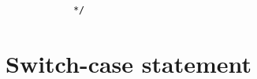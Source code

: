 \begin{itemize}
\begin{verbatim}
            */
        \end{verbatim}
\end{itemize}


\section{Switch-case statement}

